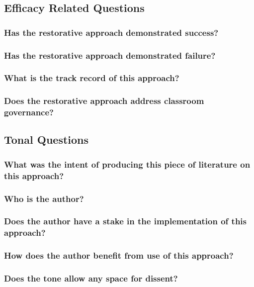 \documentclass[12pt]{article}
\begin{document}
	\subsection{Efficacy Related Questions}
	\subsubsection{Has the restorative approach demonstrated success?}
	\subsubsection{Has the restorative approach demonstrated failure?}
	\subsubsection{What is the track record of this approach?}
	\subsubsection{Does the restorative approach address classroom governance?}
	\subsection{Tonal Questions}
	\subsubsection{What was the intent of producing this piece of literature on this approach?}
	\subsubsection{Who is the author?}
	\subsubsection{Does the author have a stake in the implementation of this approach?}
	\subsubsection{How does the author benefit from use of this approach?}
	\subsubsection{Does the tone allow any space for dissent?}
\end{document}
